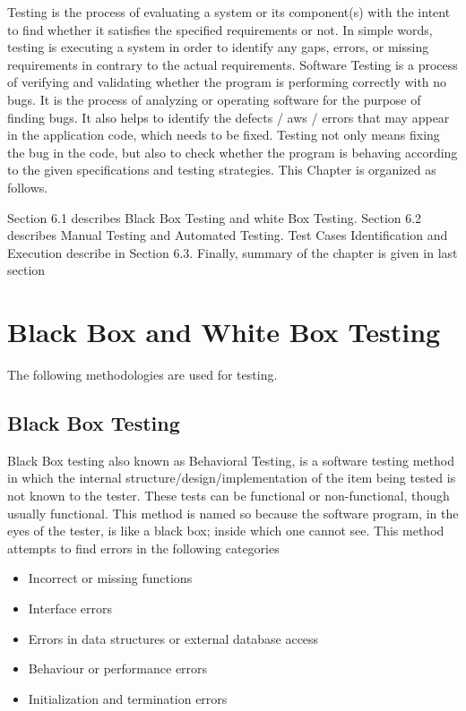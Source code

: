Testing is the process of evaluating a system or its component(s) with the intent to find
whether it satisfies the specified requirements or not. In simple words, testing is executing a
system in order to identify any gaps, errors, or missing requirements in contrary to the actual
requirements. Software Testing is a process of verifying and validating whether the program
is performing correctly with no bugs. It is the process of analyzing or operating software
for the purpose of finding bugs. It also helps to identify the defects / aws / errors that
may appear in the application code, which needs to be fixed. Testing not only means fixing
the bug in the code, but also to check whether the program is behaving according to the
given specifications and testing strategies. This Chapter is organized as follows.

Section 6.1
describes Black Box Testing and white Box Testing. Section 6.2 describes Manual Testing
and Automated Testing. Test Cases Identification and Execution describe in Section 6.3.
Finally, summary of the chapter is given in last section

\section{Black Box and White Box Testing}
The following methodologies are used for testing.
\subsection{Black Box Testing}
Black Box testing also known as Behavioral Testing, is a software testing method in which
the internal structure/design/implementation of the item being tested is not known to the
tester. These tests can be functional or non-functional, though usually functional.
This method is named so because the software program, in the eyes of the tester, is like a
black box; inside which one cannot see. This method attempts to find errors in the following categories
\begin{itemize}
\item Incorrect or missing functions
\item Interface errors
\item Errors in data structures or external database access
\item Behaviour or performance errors
\item Initialization and termination errors
\end{itemize}

